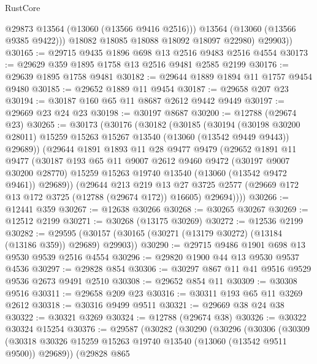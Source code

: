 \begin{lexlean}{RustCore}
\begin{coremodule}
              @29873
              @13564
              (@13060 (@13566 @9416 @2516)))
            @13564
            (@13060 (@13566 @9385 @9422)))
          @18082
          @18085
          @18088
          @18092
          @18097
          @22980)
        @29903))
@30165 := @29715 @9435 @1896 @698 @13 @2516 @9483 @2516 @4554
@30173 := @29629 @359 @1895 @1758 @13 @2516 @9481 @2585 @2199
@30176 := @29639 @1895 @1758 @9481
@30182 := @29644 @1889 @1894 @11 @1757 @9454 @9480
@30185 := @29652 @1889 @11 @9454
@30187 := @29658 @207 @23
@30194 := @30187 @160 @65 @11 @8687 @2612 @9442 @9449
@30197 := @29669 @23 @24 @23
@30198 := @30197 @8687
@30200 := @12788 (@29674 @23)
@30265 := @30173
    (@30176
      (@30182
        (@30185
          (@30194
            (@30198 @30200 @28011)
            @15259
            @15263
            @15267
            @13540
            (@13060 (@13542 @9449 @9443))
            @29689))
        (@29644
          @1891
          @1893
          @11
          @28
          @9477
          @9479
          (@29652
            @1891
            @11
            @9477
            (@30187
              @193
              @65
              @11
              @9007
              @2612
              @9460
              @9472
              (@30197 @9007 @30200 @28770)
              @15259
              @15263
              @19740
              @13540
              (@13060 (@13542 @9472 @9461))
              @29689))
          (@29644
            @213
            @219
            @13
            @27
            @3725
            @2577
            (@29669 @172 @13 @172 @3725 (@12788 (@29674 @172)) @16605)
            @29694))))
@30266 := @12441 @359
@30267 := @12638 @30266
@30268 := @30265 @30267
@30269 := @12512 @2199
@30271 := @30268 (@13175 @30269)
@30272 := @12536 @2199
@30282 := @29595 (@30157 (@30165 (@30271 (@13179 @30272) (@13184 (@13186 @359)) @29689) @29903))
@30290 := @29715 @9486 @1901 @698 @13 @9530 @9539 @2516 @4554
@30296 := @29820 @1900 @44 @13 @9530 @9537 @4536
@30297 := @29828 @854
@30306 := @30297 @867 @11 @41 @9516 @9529 @9536 @2673 @9491 @2510
@30308 := @29652 @854 @11
@30309 := @30308 @9516
@30311 := @29658 @209 @23
@30316 := @30311 @193 @65 @11 @3269 @2612
@30318 := @30316 @9499 @9511
@30321 := @29669 @38 @24 @38
@30322 := @30321 @3269
@30324 := @12788 (@29674 @38)
@30326 := @30322 @30324 @15254
@30376 := @29587
    (@30282
      (@30290
        (@30296
          (@30306
            (@30309
              (@30318 @30326 @15259 @15263 @19740 @13540 (@13060 (@13542 @9511 @9500)) @29689))
            (@29828
              @865

\end{coremodule}
\end{lexlean}
